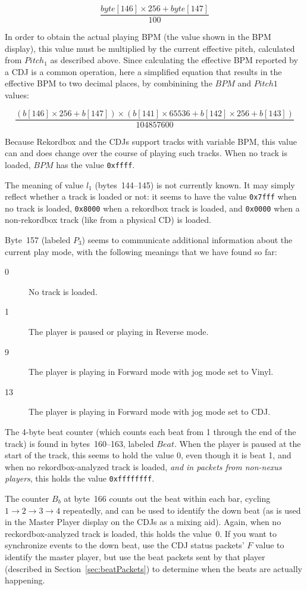 \documentclass[11pt]{article}
\begin{document}
\[ \frac{byte[146] \times 256 + byte[147]}{100} \]

In order to obtain the actual playing BPM (the value shown in the BPM
display), this value must be multiplied by the current effective
pitch, calculated from $Pitch_1$ as described above. Since calculating
the effective BPM reported by a CDJ is a common operation, here a
simplified equation that results in the effective BPM to two decimal
places, by combinining the $BPM$ and $Pitch1$ values:

\[ \frac{(b[146] \times 256 + b[147]) \times (b[141] \times 65536 + b[142]  \times 256 + b[143])}
     {104857600} \]

Because Rekordbox and the CDJs support tracks with variable BPM, this
value can and does change over the course of playing such tracks. When
no track is loaded, $BPM$ has the value {\tt 0xffff}.

The meaning of value $l_1$ (bytes~144--145) is not currently known. It
may simply reflect whether a track is loaded or not: it seems to have
the value {\tt 0x7fff} when no track is loaded, {\tt 0x8000} when a
rekordbox track is loaded, and {\tt 0x0000} when a non-rekordbox track
(like from a physical CD) is loaded.

Byte~157 (labeled $P_3$) seems to communicate additional information
about the current play mode, with the following meanings that we have
found so far:
\begin{description}
\item[0] No track is loaded.
\item[1] The player is paused or playing in Reverse mode.
\item[9] The player is playing in Forward mode with jog mode set to Vinyl.
\item[13] The player is playing in Forward mode with jog mode set to CDJ.
\end{description}

The 4-byte beat counter (which counts each beat from 1 through the end
of the track) is found in bytes~160--163, labeled $Beat$. When the
player is paused at the start of the track, this seems to hold the
value 0, even though it is beat 1, and when no rekordbox-analyzed
track is loaded, \emph{and in packets from non-nexus players}, this
holds the value {\tt 0xffffffff}.

The counter $B_b$ at byte~166 counts out the beat within each bar,
cycling $1\to2\to3\to4$ repeatedly, and can be used to identify the
down beat (as is used in the Master Player display on the CDJs as a
mixing aid). Again, when no reckordbox-analyzed track is loaded, this
holds the value~0. If you want to synchronize events to the down beat,
use the CDJ status packets' $F$ value to identify the master player,
but use the beat packets sent by that player (described in
Section~\ref{sec:beatPackets}) to determine when the beats are
actually happening.
\end{document}
